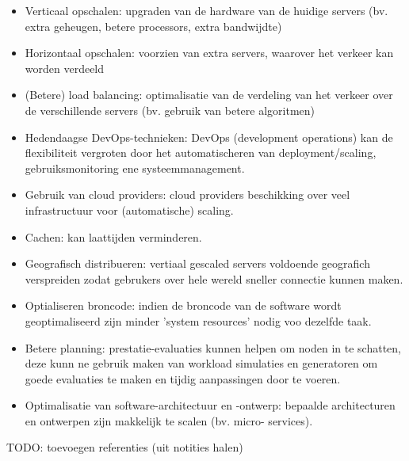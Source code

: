 \begin{itemize}
    \item Verticaal opschalen: upgraden van de hardware van de huidige
    servers (bv. extra geheugen, betere processors, extra bandwijdte)
    \item Horizontaal opschalen: voorzien van extra servers, waarover het
    verkeer kan worden verdeeld
    \item (Betere) load balancing: optimalisatie van de verdeling van het
    verkeer over de verschillende servers (bv. gebruik van betere
    algoritmen)
    \item Hedendaagse DevOps-technieken: DevOps (development operations) kan
    de flexibiliteit vergroten door het automatischeren van deployment/scaling,
    gebruiksmonitoring ene systeemmanagement.
    \item Gebruik van cloud providers: cloud providers beschikking over
    veel infrastructuur voor (automatische) scaling.
    \item Cachen: kan laattijden verminderen.
    \item Geografisch distribueren: vertiaal gescaled servers voldoende
    geografich verspreiden zodat gebrukers over hele wereld sneller
    connectie kunnen maken.
    \item Optialiseren broncode: indien de broncode van de software wordt
    geoptimaliseerd zijn minder 'system resources' nodig voo dezelfde
    taak.
    \item Betere planning: prestatie-evaluaties kunnen helpen om noden in
    te schatten, deze kunn ne gebruik maken van workload simulaties en
    generatoren om goede evaluaties te maken en tijdig aanpassingen door
    te voeren.
    \item Optimalisatie van software-architectuur en -ontwerp:
    bepaalde architecturen en ontwerpen zijn makkelijk te scalen (bv. micro-
    services).
\end{itemize}


TODO: toevoegen referenties (uit notities halen)